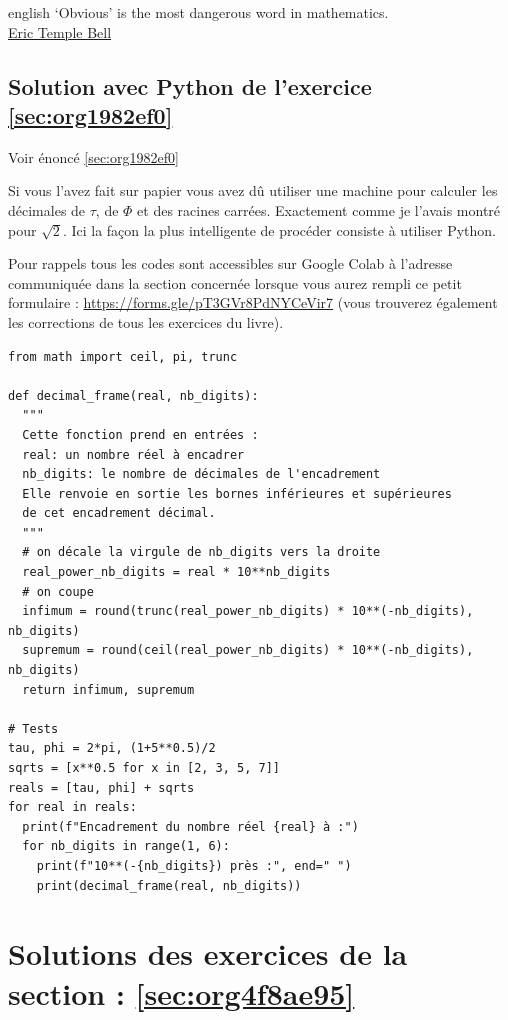 \documentclass[a4paper, 11pt, twoside]{book}
\begin{document}
\begin{foreigndisplayquote}{english}
‘Obvious’ is the most dangerous word in mathematics.\\

\href{https://en.wikipedia.org/wiki/Eric\_Temple\_Bell}{Eric Temple Bell}
\end{foreigndisplayquote}

\section{Solution avec Python de l'exercice \ref{sec:org1982ef0}}
\label{sec:org4c8a063}
Voir énoncé \ref{sec:org1982ef0}

Si vous l'avez fait sur papier vous avez dû utiliser une machine
pour calculer les décimales de \(\tau\), de \(\Phi\) et des racines
carrées. Exactement comme je l'avais montré pour \(\sqrt{2}\). Ici
la façon la plus intelligente de procéder consiste à utiliser
Python.

Pour rappels tous les codes sont accessibles sur Google Colab à
l'adresse communiquée dans la section concernée lorsque vous
aurez rempli ce petit formulaire :
\url{https://forms.gle/pT3GVr8PdNYCeVir7} (vous trouverez également
les corrections de tous les exercices du livre).

\begin{verbatim}
from math import ceil, pi, trunc

def decimal_frame(real, nb_digits):
  """
  Cette fonction prend en entrées : 
  real: un nombre réel à encadrer
  nb_digits: le nombre de décimales de l'encadrement
  Elle renvoie en sortie les bornes inférieures et supérieures 
  de cet encadrement décimal.
  """
  # on décale la virgule de nb_digits vers la droite
  real_power_nb_digits = real * 10**nb_digits 
  # on coupe
  infimum = round(trunc(real_power_nb_digits) * 10**(-nb_digits), nb_digits)
  supremum = round(ceil(real_power_nb_digits) * 10**(-nb_digits), nb_digits)
  return infimum, supremum

# Tests
tau, phi = 2*pi, (1+5**0.5)/2
sqrts = [x**0.5 for x in [2, 3, 5, 7]]
reals = [tau, phi] + sqrts
for real in reals:
  print(f"Encadrement du nombre réel {real} à :")
  for nb_digits in range(1, 6): 
    print(f"10**(-{nb_digits}) près :", end=" ")
    print(decimal_frame(real, nb_digits))
\end{verbatim}
\stopcontents[level-2]

\chapter{Solutions des exercices de la section : \ref{sec:org4f8ae95}}
\label{sec:org86d9fb1}
\startcontents[level-2]
\end{document}
